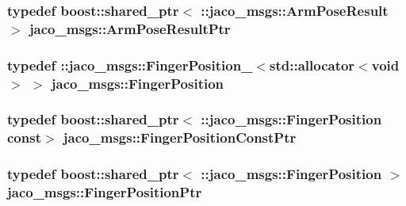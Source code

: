\subsubsection[{\texorpdfstring{Arm\+Pose\+Result\+Ptr}{ArmPoseResultPtr}}]{\setlength{\rightskip}{0pt plus 5cm}typedef boost\+::shared\+\_\+ptr$<$ \+::{\bf jaco\+\_\+msgs\+::\+Arm\+Pose\+Result} $>$ {\bf jaco\+\_\+msgs\+::\+Arm\+Pose\+Result\+Ptr}}\hypertarget{namespacejaco__msgs_a8098e9c28ec21df7e002a399d23c48d1}{}\label{namespacejaco__msgs_a8098e9c28ec21df7e002a399d23c48d1}
\subsubsection[{\texorpdfstring{Finger\+Position}{FingerPosition}}]{\setlength{\rightskip}{0pt plus 5cm}typedef \+::{\bf jaco\+\_\+msgs\+::\+Finger\+Position\+\_\+}$<$std\+::allocator$<$void$>$ $>$ {\bf jaco\+\_\+msgs\+::\+Finger\+Position}}\hypertarget{namespacejaco__msgs_a8d92f0e718e45f82b621ddf049a2f110}{}\label{namespacejaco__msgs_a8d92f0e718e45f82b621ddf049a2f110}
\subsubsection[{\texorpdfstring{Finger\+Position\+Const\+Ptr}{FingerPositionConstPtr}}]{\setlength{\rightskip}{0pt plus 5cm}typedef boost\+::shared\+\_\+ptr$<$ \+::{\bf jaco\+\_\+msgs\+::\+Finger\+Position} const$>$ {\bf jaco\+\_\+msgs\+::\+Finger\+Position\+Const\+Ptr}}\hypertarget{namespacejaco__msgs_acb9f03caff18d5ea850efba0ccbb807b}{}\label{namespacejaco__msgs_acb9f03caff18d5ea850efba0ccbb807b}
\subsubsection[{\texorpdfstring{Finger\+Position\+Ptr}{FingerPositionPtr}}]{\setlength{\rightskip}{0pt plus 5cm}typedef boost\+::shared\+\_\+ptr$<$ \+::{\bf jaco\+\_\+msgs\+::\+Finger\+Position} $>$ {\bf jaco\+\_\+msgs\+::\+Finger\+Position\+Ptr}}\hypertarget{namespacejaco__msgs_a07dcbbbd6b126792a3b2cbd5d9f055e3}{}\label{namespacejaco__msgs_a07dcbbbd6b126792a3b2cbd5d9f055e3}
